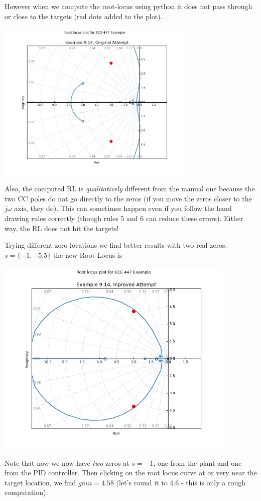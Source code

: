 \begin{ExampleCont}
However when we compute the root-locus using python
it does not pass through or close to the targets (red dots added to the plot).

\begin{center}
  \includegraphics[width=95mm]{figs09/R27J16.png}
\end{center}

Also, the computed RL is {\it qualitatively } different from the manual one because the two CC poles
do not go directly to the zeros (if you move the zeros closer to the $j\omega$ axis, they do).
This can sometimes happen even if you follow the hand drawing rules correctly
(though rules 5 and 6 can reduce these errors).   Either way, the RL does not hit the targets!

Trying different zero locations we find better results with two real
zeros: $s= \{-1,-5.5\}$
the new Root Locus is

\begin{center}
\includegraphics[width=115mm]{figs09/R27J17.png}
\end{center}

Note that now  we now have {\it two} zeros at $s=-1$, one from
the plant and one from the PID controller.   Then clicking on the root locus curve at or
very near the target location, we find $gain = 4.58$  (let's round it to 4.6
- this is only a rough computation).


\end{ExampleCont}
